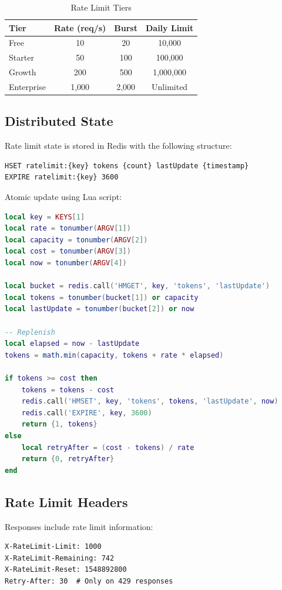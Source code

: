 \begin{table}[h]
\centering
\caption{Rate Limit Tiers}
\begin{tabular}{lccc}
\toprule
\textbf{Tier} & \textbf{Rate (req/s)} & \textbf{Burst} & \textbf{Daily Limit} \\
\midrule
Free & 10 & 20 & 10,000 \\
Starter & 50 & 100 & 100,000 \\
Growth & 200 & 500 & 1,000,000 \\
Enterprise & 1,000 & 2,000 & Unlimited \\
\bottomrule
\end{tabular}
\end{table}

\subsection{Distributed State}

Rate limit state is stored in Redis with the following structure:

\begin{lstlisting}[caption=Redis Rate Limit State]
HSET ratelimit:{key} tokens {count} lastUpdate {timestamp}
EXPIRE ratelimit:{key} 3600
\end{lstlisting}

Atomic update using Lua script:

\begin{lstlisting}[language=Lua, caption=Atomic Rate Limit Check]
local key = KEYS[1]
local rate = tonumber(ARGV[1])
local capacity = tonumber(ARGV[2])
local cost = tonumber(ARGV[3])
local now = tonumber(ARGV[4])

local bucket = redis.call('HMGET', key, 'tokens', 'lastUpdate')
local tokens = tonumber(bucket[1]) or capacity
local lastUpdate = tonumber(bucket[2]) or now

-- Replenish
local elapsed = now - lastUpdate
tokens = math.min(capacity, tokens + rate * elapsed)

if tokens >= cost then
    tokens = tokens - cost
    redis.call('HMSET', key, 'tokens', tokens, 'lastUpdate', now)
    redis.call('EXPIRE', key, 3600)
    return {1, tokens}
else
    local retryAfter = (cost - tokens) / rate
    return {0, retryAfter}
end
\end{lstlisting}

\subsection{Rate Limit Headers}

Responses include rate limit information:

\begin{lstlisting}[caption=Rate Limit Headers]
X-RateLimit-Limit: 1000
X-RateLimit-Remaining: 742
X-RateLimit-Reset: 1548892800
Retry-After: 30  # Only on 429 responses
\end{lstlisting}


